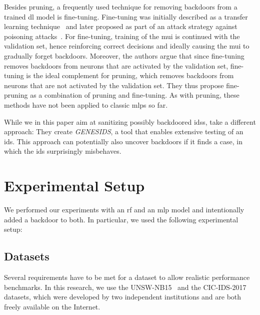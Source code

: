 \documentclass[9pt,sigconf,letterpaper,dvipsnames\ifx\removeHeaders\tempYes ,nonacm\fi]{acmart}
\newcommand\note[2]{{\color{#1}#2}}
\newcommand\todo[1]{{\note{red}{TODO: #1}}}
\newcommand{\unsw}{UNSW-NB15}
\newcommand{\cic}{CIC-IDS-2017}
\begin{document}
Besides pruning, a frequently used technique for removing backdoors from a trained \gls{dl} model is fine-tuning. Fine-tuning was initially described as a transfer learning technique~\cite{yosinski_how_2014} and later proposed as part of an attack strategy against poisoning attacks~\cite{liu_fine-pruning:_2018}. For fine-tuning, training of the \gls{mui} is continued with the validation set, hence reinforcing correct decisions and ideally causing the \gls{mui} to gradually forget backdoors. Moreover, the authors argue that since fine-tuning removes backdoors from neurons that are activated by the validation set, fine-tuning is the ideal complement for pruning, which removes backdoors from neurons that are not activated by the validation set. They thus propose fine-pruning as a combination of pruning and fine-tuning. As with pruning, these methods have not been applied to classic \glspl{mlp} so far.

While we in this paper aim at sanitizing possibly backdoored \glspl{ids}, \cite{erlacher_how_2018} take a different approach: They create \textit{GENESIDS}, a tool that enables extensive testing of an \gls{ids}. This approach can potentially also uncover backdoors if it finds a case, in which the \gls{ids} surprisingly misbehaves. 

\section{Experimental Setup} \label{sec:ml_approaches}
We performed our experiments with an \gls{rf} and an \gls{mlp} model and intentionally added a backdoor to both. In particular, we used the following experimental setup:
\subsection{Datasets}

Several requirements have to be met for a dataset to allow realistic performance benchmarks. %
In this research, we use the \unsw{}~\cite{moustafa_unsw-nb15:_2015} and the \cic{}~\cite{sharafaldin_toward_2018} datasets, which were developed by two independent institutions and are both freely available on the Internet. %
\end{document}
